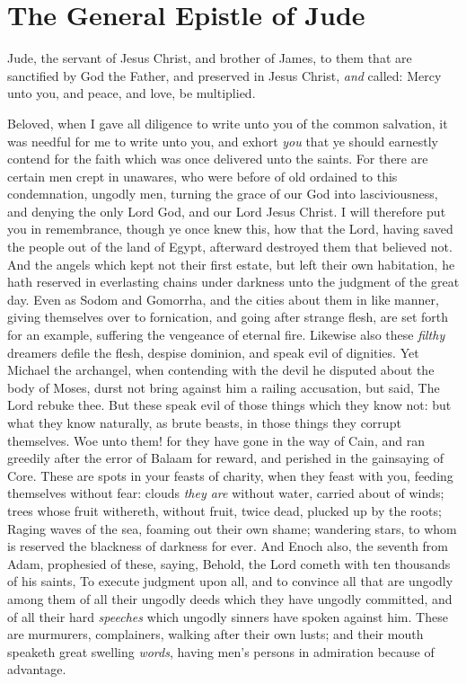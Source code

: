 \documentclass[11pt,letterpaper,oneside]{memoir}
\begin{document}
\chapter[Jude]{The General Epistle of Jude}

Jude, the servant of Jesus Christ, and brother of James, to them that
are sanctified by God the Father, and preserved in Jesus Christ,
\emph{and} called:  Mercy unto you, and peace, and love, be
multiplied.

Beloved, when I gave all diligence to write unto you of the common
salvation, it was needful for me to write unto you, and exhort
\emph{you} that ye should earnestly contend for the faith which was
once delivered unto the saints.  For there are certain men crept in
unawares, who were before of old ordained to this condemnation,
ungodly men, turning the grace of our God into lasciviousness, and
denying the only Lord God, and our Lord Jesus Christ.  I will
therefore put you in remembrance, though ye once knew this, how that
the Lord, having saved the people out of the land of Egypt, afterward
destroyed them that believed not.  And the angels which kept not their
first estate, but left their own habitation, he hath reserved in
everlasting chains under darkness unto the judgment of the great day.
Even as Sodom and Gomorrha, and the cities about them in like manner,
giving themselves over to fornication, and going after strange flesh,
are set forth for an example, suffering the vengeance of eternal fire.
Likewise also these \emph{filthy} dreamers defile the flesh, despise
dominion, and speak evil of dignities.  Yet Michael the archangel,
when contending with the devil he disputed about the body of Moses,
durst not bring against him a railing accusation, but said, The Lord
rebuke thee.  But these speak evil of those things which they know
not: but what they know naturally, as brute beasts, in those things
they corrupt themselves.  Woe unto them! for they have gone in the way
of Cain, and ran greedily after the error of Balaam for reward, and
perished in the gainsaying of Core.  These are spots in your feasts of
charity, when they feast with you, feeding themselves without fear:
clouds \emph{they are} without water, carried about of winds; trees
whose fruit withereth, without fruit, twice dead, plucked up by the
roots;  Raging waves of the sea, foaming out their own shame;
wandering stars, to whom is reserved the blackness of darkness for
ever.  And Enoch also, the seventh from Adam, prophesied of these,
saying, Behold, the Lord cometh with ten thousands of his saints,  To
execute judgment upon all, and to convince all that are ungodly among
them of all their ungodly deeds which they have ungodly committed, and
of all their hard \emph{speeches} which ungodly sinners have spoken
against him.  These are murmurers, complainers, walking after their
own lusts; and their mouth speaketh great swelling \emph{words},
having men's persons in admiration because of advantage.
\end{document}
